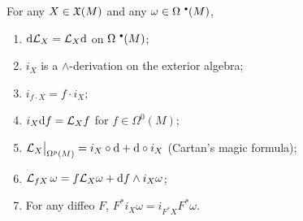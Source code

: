 \begin{prop} For any $X\in\mathfrak{X}(M)$ and any $\omega\in\Omega^{\smbullet }(M)$,
\begin{enumerate}
    \item ${\mathrm{d}}\mathcal{L}_X=\mathcal{L}_X{\mathrm{d}}$ on $\Omega^{\smbullet }(M)$;
    \item $i_X$ is a $\wedge$-derivation on the exterior algebra;
    \item $i_{f\cdot X}=f\cdot i_X$;
    \item $i_X{\mathrm{d}} f=\mathcal{L}_X f$ for $f\in \Omega^0(M)$;
    \item $\restr{\Lie_X}{\Omega^p(M)}=i_X\circ\dd+\dd\circ i_X$ (Cartan's magic formula);
    \item $\mathcal{L}_{fX}\,\omega=f\mathcal{L}_X\omega +{\mathrm{d}} f\wedge i_X\omega$;
    \item For any diffeo $F$, $F^\ast i_X\omega =i_{F^\ast X}F^\ast\omega$.
\end{enumerate}
\end{prop}
